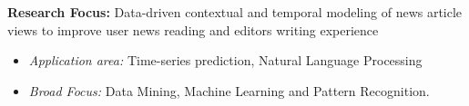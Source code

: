 \par{\textbf{Research Focus:} Data-driven contextual and temporal modeling of news article views to improve user news reading and editors writing experience\vspace{0.5em}
\begin{itemize}
  \item \textit{Application area:} Time-series prediction, Natural Language Processing\\
  \item \textit{Broad Focus:} Data Mining, Machine Learning and Pattern Recognition.\\
\end{itemize}
}
